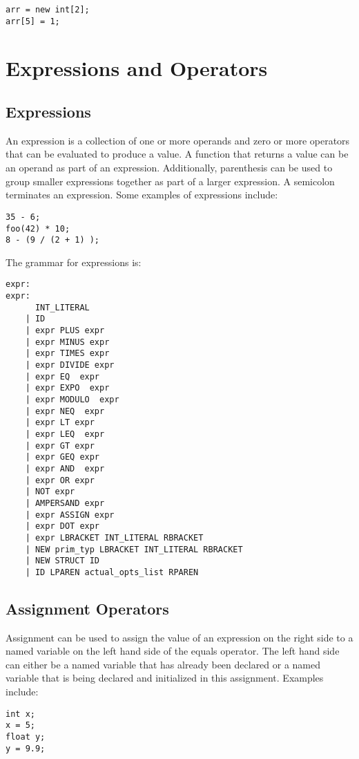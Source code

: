 \documentclass{article}
\begin{document}
 \begin{lstlisting}
arr = new int[2];
arr[5] = 1;
\end{lstlisting}

\section{Expressions and Operators}

\subsection{Expressions}
An expression is a collection of one or more operands and zero or more operators that can be evaluated to produce a value.  A function that returns a value can be an operand as part of an expression.  Additionally, parenthesis can be used to group smaller expressions together as part of a larger expression.  A semicolon terminates an expression.  Some examples of expressions include:
\begin{lstlisting}
35 - 6;
foo(42) * 10;
8 - (9 / (2 + 1) );
\end{lstlisting}

The grammar for expressions is: 
\begin{Verbatim}[frame=single]
expr:
expr:
	  INT_LITERAL 	
	| ID 		
	| expr PLUS expr
	| expr MINUS expr
	| expr TIMES expr 
	| expr DIVIDE expr 	
	| expr EQ  expr 
	| expr EXPO  expr 
	| expr MODULO  expr 	
	| expr NEQ  expr 	
	| expr LT expr 		
	| expr LEQ  expr 
	| expr GT expr 		
	| expr GEQ expr 	
	| expr AND  expr 	
	| expr OR expr 		
	| NOT expr		
	| AMPERSAND expr	
	| expr ASSIGN expr
	| expr DOT expr 	
	| expr LBRACKET INT_LITERAL RBRACKET 	   
	| NEW prim_typ LBRACKET INT_LITERAL RBRACKET
	| NEW STRUCT ID 			
	| ID LPAREN actual_opts_list RPAREN          
\end{Verbatim}



\subsection{Assignment Operators}
Assignment can be used to assign the value of an expression on the right side to a named variable on the left hand side of the equals operator.  The left hand side can either be a named variable that has already been declared or a named variable that is being declared and initialized in this assignment.  Examples include:
\begin{lstlisting}
int x;
x = 5;
float y;
y = 9.9;
\end{lstlisting}
\end{document}

